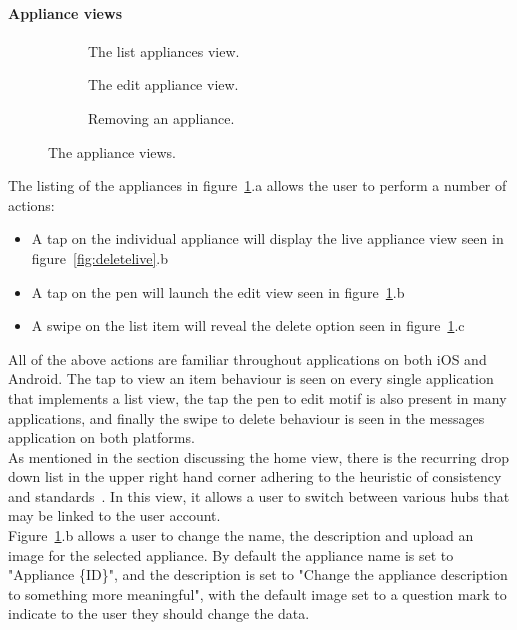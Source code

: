 \documentclass[preprint,12pt,3p]{elsarticle}
\begin{document}
\paragraph{Appliance views}
\begin{figure}[H]
    \centering
    \begin{subfigure}[t]{0.32\columnwidth}
        \centering
        \caption{The list appliances view.}
    \end{subfigure}
    \begin{subfigure}[t]{0.32\columnwidth}
        \centering
        \caption{The edit appliance view.}
    \end{subfigure}
    \begin{subfigure}[t]{0.32\columnwidth}
        \centering
        \caption{Removing an appliance.}
    \end{subfigure}
    \caption{The appliance views.}
    \label{fig:fuseviews}
\end{figure}
The listing of the appliances in figure~\ref{fig:fuseviews}.a allows the user to perform a number of actions:
\begin{itemize}
\item A tap on the individual appliance will display the live appliance view seen in figure~\ref{fig:deletelive}.b
\item A tap on the pen will launch the edit view seen in figure~\ref{fig:fuseviews}.b
\item A swipe on the list item will reveal the delete option seen in figure~\ref{fig:fuseviews}.c
\end{itemize}
All of the above actions are familiar throughout applications on both iOS and Android. The tap to view an item behaviour is seen on every single application that implements a list view, the tap the pen to edit motif is also present in many applications, and finally the swipe to delete behaviour is seen in the messages application on both platforms.\\
As mentioned in the section discussing the home view, there is the recurring drop down list in the upper right hand corner adhering to the heuristic of consistency and standards~\cite{nielsen}. In this view, it allows a user to switch between various hubs that may be linked to the user account.\\
Figure~\ref{fig:fuseviews}.b allows a user to change the name, the description and upload an image for the selected appliance. By default the appliance name is set to "Appliance \{ID\}", and the description is set to "Change the appliance description to something more meaningful", with the default image set to a question mark to indicate to the user they should change the data.\\
\end{document}
